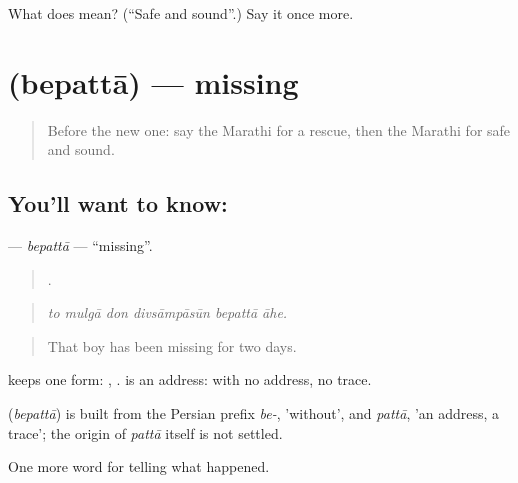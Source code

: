 \begin{tcolorbox}[breakable,colback=teal!4,colframe=teal!35!black,title={Before you move on}]
What does  mean? (\textquotedblleft{}Safe and sound\textquotedblright{}.) Say it once more.
\end{tcolorbox}
\section[\texorpdfstring{\mr{बेपत्ता} (bepattā)}{बेपत्ता (bepattā)}]{ (bepattā) — missing}

\label{lesson:MR-C291-bepatta}



\begin{quote}
Before the new one: say the Marathi for a rescue, then the Marathi for safe and sound.
\end{quote}

\subsection*{You'll want to know: }
\textbf{} — \emph{bepattā} — \textquotedblleft{}missing\textquotedblright{}.

\begin{quote}
     .
\end{quote}

\begin{quote}
\emph{to mulgā don divsāmpāsūn bepattā āhe.}
\end{quote}

\begin{quote}
That boy has been missing for two days.
\end{quote}

 keeps one form:  ,  .  is an address: with no address, no trace.

\begin{cousinweb}
\textbf{} (\emph{bepattā}) is built from the Persian prefix \emph{be-}, 'without', and \emph{pattā}, 'an address, a trace'; the origin of \emph{pattā} itself is not settled.
\end{cousinweb}

\begin{grammarlens}[title={What you've built}]
One more word for telling what happened.
\end{grammarlens}

